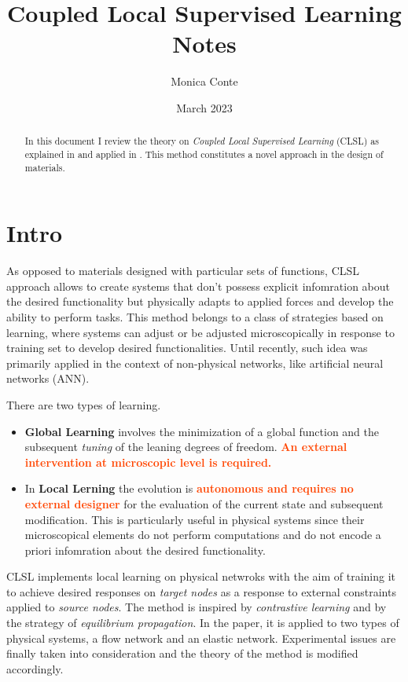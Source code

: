 \documentclass[11pt]{article}
\title{Coupled Local Supervised Learning Notes}
\author{Monica Conte}
\date{March 2023}
\newcommand{\important}[1]{\textcolor{OrangeRed}{\bf{#1}}}
\begin{document}
\captionsetup{width=0.85\textwidth}

\maketitle

\renewcommand{\abstractname}{}
\begin{abstract}
    In this document I review the theory on \textit{Coupled Local Supervised Learning} (CLSL) as explained in \cite{} and applied in \cite{}. This method constitutes a novel approach in the design of materials.

\end{abstract}

\tableofcontents


\newpage

\section{Intro}

As opposed to materials designed with particular sets of functions, CLSL approach allows to create systems that don't possess explicit infomration about the desired functionality but physically adapts to applied forces and develop the ability to perform tasks. This method belongs to a class of strategies based on learning, where systems can adjust or be adjusted microscopically in response to training set to develop desired functionalities. Until recently, such idea was primarily applied in the context of non-physical networks, like artificial neural networks (ANN).

There are two types of learning. 
\begin{itemize}
\item \textbf{Global Learning} involves the minimization of a global function and the subsequent \textit{tuning} of the leaning degrees of freedom. \important{An external intervention at microscopic level is required.} 
\item In \textbf{Local Lerning} the evolution is \important{autonomous and requires no external designer} for the evaluation of the current state and subsequent modification. This is particularly useful in physical systems since their microscopical elements do not perform computations and do not encode a priori infomration about the desired functionality. 
\end{itemize}

CLSL implements local learning on physical netwroks with the aim of training it to achieve desired responses on \textit{target nodes} as a response to external constraints applied to \textit{source nodes}. The method is inspired by \textit{contrastive learning} and by the strategy of \textit{equilibrium propagation}. In the paper, it is applied to two types of physical systems, a flow network and an elastic network. Experimental issues are finally taken into consideration and the theory of the method is modified accordingly. 
\end{document}

